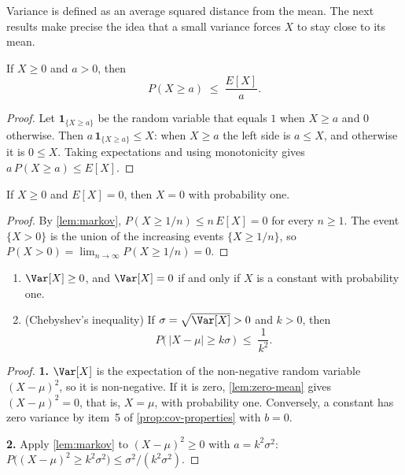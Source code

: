 Variance is defined as an average squared distance from the mean.
The next results make precise the idea that a small variance forces $X$ to stay close to its mean.

\begin{lemma}\label{lem:markov}
	If $X\ge0$ and $a>0$, then
	\[
		P(X\ge a) \;\le\; \frac{E[X]}{a} .
	\]
\end{lemma}

\begin{proof}
	Let $\mathbf{1}_{\{X\ge a\}}$ be the random variable that equals $1$ when $X\ge a$ and $0$ otherwise.
	Then $a\,\mathbf{1}_{\{X\ge a\}}\le X$: when $X\ge a$ the left side is $a\le X$, and otherwise it is $0\le X$.
	Taking expectations and using monotonicity gives $a\,P(X\ge a)\le E[X]$.
\end{proof}

\begin{lemma}\label{lem:zero-mean}
	If $X\ge0$ and $E[X]=0$, then $X=0$ with probability one.
\end{lemma}

\begin{proof}
	By \autoref{lem:markov}, $P(X\ge1/n)\le n\,E[X]=0$ for every $n\ge1$.
	The event $\{X>0\}$ is the union of the increasing events $\{X\ge1/n\}$, so $P(X>0)=\lim_{n\to\infty}P(X\ge1/n)=0$.
\end{proof}

\begin{proposition}\label{prop:var-properties}
	\begin{enumerate}[nosep]
		\item $\Var[X]\ge0$, and $\Var[X]=0$ if and only if $X$ is a constant with probability one.
		\item (Chebyshev's inequality) If $\sigma=\sqrt{\Var[X]}>0$ and $k>0$, then
		      \[
			      P\bigl(\,|X-\mu|\ge k\sigma\,\bigr) \;\le\; \frac{1}{k^{2}} .
		      \]
	\end{enumerate}
\end{proposition}

\begin{proof}
	\textbf{1.} $\Var[X]$ is the expectation of the non-negative random variable $(X-\mu)^{2}$, so it is non-negative.
	If it is zero, \autoref{lem:zero-mean} gives $(X-\mu)^{2}=0$, that is, $X=\mu$, with probability one.
	Conversely, a constant has zero variance by item~5 of \autoref{prop:cov-properties} with $b=0$.

	\textbf{2.} Apply \autoref{lem:markov} to $(X-\mu)^{2}\ge0$ with $a=k^{2}\sigma^{2}$:
	$P\bigl((X-\mu)^{2}\ge k^{2}\sigma^{2}\bigr)\le\sigma^{2}/(k^{2}\sigma^{2})$.
\end{proof}

